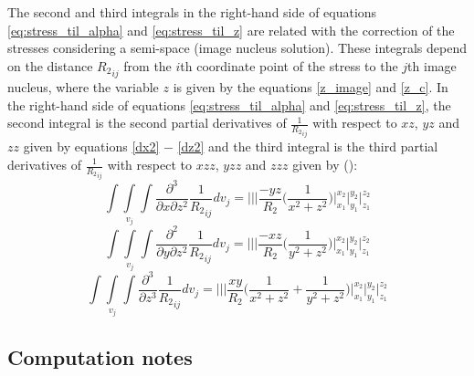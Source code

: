 \documentclass[journal abbreviation, manuscript]{copernicus}
\begin{document}
The second and third integrals in the right-hand side of  equations  \ref{eq:stress_til_alpha}  and \ref{eq:stress_til_z} are related with the correction of the stresses considering  a semi-space (image nucleus solution).
These integrals depend on the distance ${R_2}_{ij}$ from the $i$th coordinate point of the stress to the $j$th image nucleus, where the variable $z$ is given by the equations \ref{z_image} and \ref{z_c}.
In the right-hand side of  equations  \ref{eq:stress_til_alpha} and \ref{eq:stress_til_z}, 
the second integral is the second partial derivatives of ${\frac{1}{{R_2}_{ij}}}$ with respect to $xz$, $yz$ and $zz$ given by equations  \ref{dx2} $-$ \ref{dz2} and the third integral is the third partial derivatives of ${\frac{1}{{R_2}_{ij}}}$ with respect to $xzz$, $yzz$ and $zzz$ given by (\cite{Nagyetal2000}):
\begin{equation}
\int\int\limits_{v_j}\int 
\frac{\partial^{3}}{\partial x \partial z^{2}} {\frac{1}{{R_2}_{ij}}}  dv_j =
\Bigg|\Bigg|\Bigg| 
\frac{- y z}{R_2} \Big( \frac{1}{x^{2} + z^{2}} \Big)
\Bigg|_{x_1}^{x_2} \Bigg|_{y_1}^{y_2} \Bigg|_{z_1}^{z_2}
\label{sx3}
\end{equation}
\begin{equation}
\int\int\limits_{v_j}\int  
\frac{\partial^{2}  }{\partial y \partial z^{2}} {\frac{1}{{R_2}_{ij}}}  dv_j =
\Bigg|\Bigg|\Bigg|
\frac{- x z}{R_2} \Big( \frac{1}{y^{2} + z^{2}} \Big)
\Bigg|_{x_1}^{x_2} \Bigg|_{y_1}^{y_2} \Bigg|_{z_1}^{z_2}
\label{sy3}
\end{equation}
\begin{equation}
\int\int\limits_{v_j}\int 
\frac{\partial^{3}  }{\partial z^{3}} {\frac{1}{{R_2}_{ij}}}  dv_j =
\Bigg|\Bigg|\Bigg|
\frac{ x y}{R_2} \Big( \frac{1}{x^{2} + z^{2}} + \frac{1}{y^{2} + z^{2}} \Big)
\Bigg|_{x_1}^{x_2} \Bigg|_{y_1}^{y_2} \Bigg|_{z_1}^{z_2}
\label{sz3}
\end{equation}

\subsection{Computation notes}
\end{document}
